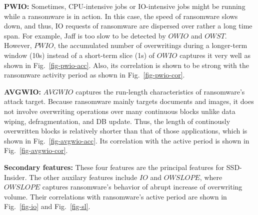 \documentclass[conference]{IEEEtran}
\newcommand{\ours}{SSD-Insider}
\begin{document}
{\bf PWIO:} Sometimes, CPU-intensive jobs or IO-intensive jobs might be running 
while a ransomware is in action.
In this case, the speed of ransomware slows down, and thus, 
IO requests of ransomware are dispersed over 
rather a long time span. For example, Jaff is too slow to be detected by $OWIO$ and $OWST$.
However, $PWIO$, the accumulated number of overwritings 
during a longer-term window (10s) instead of a short-term slice (1s) of $OWIO$ 
captures it very well as shown in Fig.~\ref{fig-pwio-acc}. Also, its correlation is 
shown to be strong with the ransomware activity period as shown in Fig.~\ref{fig-pwio-cor}.

{\bf AVGWIO:} $AVGWIO$ captures the run-length characteristics of ransomware's attack target. 
Because ransomware mainly targets documents and images, 
it does not involve overwriting operations
over many continuous blocks unlike data wiping, defragmentation, and DB update.  
Thus, the length of continously overwritten blocks is relatively shorter than that of those applications, which is shown in Fig.~\ref{fig-avgwio-acc}. Its correlation with the active 
period is shown in Fig.~\ref{fig-avgwio-cor}.

{\bf Secondary features:} These four features are the principal features for \ours{}.
The other auxilary features include $IO$ and $OWSLOPE$, 
where $OWSLOPE$ captures ransomware's behavior of abrupt increase of overwriting volume.
Their correlations with ransomware's active period are shown in Fig.~\ref{fig-io} and
Fig.~\ref{fig-sl}.
\end{document}

